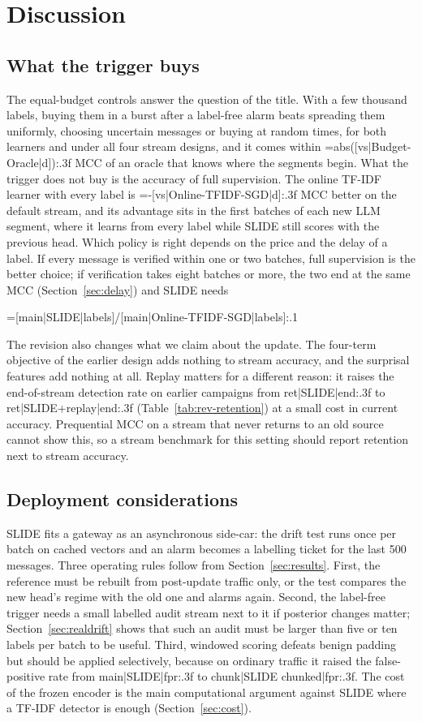 \section{Discussion}\label{sec:discussion}

\subsection{What the trigger buys}
The equal-budget controls answer the question of the title. With a few thousand labels, buying them in a burst after a label-free alarm beats spreading them uniformly, choosing uncertain messages or buying at random times, for both learners and under all four stream designs, and it comes within {{=abs([vs|Budget-Oracle|d]):.3f}} MCC of an oracle that knows where the segments begin. What the trigger does not buy is the accuracy of full supervision. The online TF-IDF learner with every label is {{=-[vs|Online-TFIDF-SGD|d]:.3f}} MCC better on the default stream, and its advantage sits in the first batches of each new LLM segment, where it learns from every label while SLIDE still scores with the previous head. Which policy is right depends on the price and the delay of a label. If every message is verified within one or two batches, full supervision is the better choice; if verification takes eight batches or more, the two end at the same MCC (Section~\ref{sec:delay}) and SLIDE needs {{=[main|SLIDE|labels]/[main|Online-TFIDF-SGD|labels]:.1%

The revision also changes what we claim about the update. The four-term objective of the earlier design adds nothing to stream accuracy, and the surprisal features add nothing at all. Replay matters for a different reason: it raises the end-of-stream detection rate on earlier campaigns from {{ret|SLIDE|end:.3f}} to {{ret|SLIDE+replay|end:.3f}} (Table~\ref{tab:rev-retention}) at a small cost in current accuracy. Prequential MCC on a stream that never returns to an old source cannot show this, so a stream benchmark for this setting should report retention next to stream accuracy.

\subsection{Deployment considerations}
SLIDE fits a gateway as an asynchronous side-car: the drift test runs once per batch on cached vectors and an alarm becomes a labelling ticket for the last 500 messages. Three operating rules follow from Section~\ref{sec:results}. First, the reference must be rebuilt from post-update traffic only, or the test compares the new head's regime with the old one and alarms again. Second, the label-free trigger needs a small labelled audit stream next to it if posterior changes matter; Section~\ref{sec:realdrift} shows that such an audit must be larger than five or ten labels per batch to be useful. Third, windowed scoring defeats benign padding but should be applied selectively, because on ordinary traffic it raised the false-positive rate from {{main|SLIDE|fpr:.3f}} to {{chunk|SLIDE chunked|fpr:.3f}}. The cost of the frozen encoder is the main computational argument against SLIDE where a TF-IDF detector is enough (Section~\ref{sec:cost}).

}}
